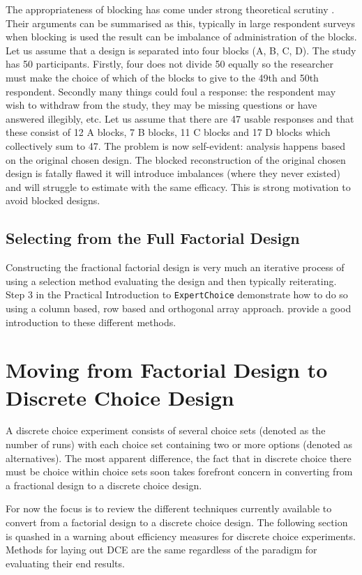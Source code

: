 \documentclass[article, crop=false]{standalone}
\begin{document}
The appropriateness of blocking has come under strong theoretical scrutiny \citep{hensherrosegreene2015, rose2009efficient-stated-choice}.
Their arguments can be summarised as this, typically in large respondent surveys when blocking is used the result can be imbalance of administration of the blocks.
Let us assume that a design is separated into four blocks (A, B, C, D). The study has 50 participants.
Firstly, four does not divide 50 equally so the researcher must make the choice of which of the blocks to give to the 49th and 50th respondent. Secondly many things could foul a response: the respondent may wish to withdraw from the study, they may be missing questions or have answered illegibly, etc.
Let us assume that there are 47 usable responses and that these consist of 12 A blocks, 7 B blocks, 11 C blocks and 17 D blocks which collectively sum to 47.
The problem is now self-evident: analysis happens based on the original chosen design.
The blocked reconstruction of the original chosen design is fatally flawed it will introduce imbalances (where they never existed) and will struggle to estimate with the same efficacy.
This is strong motivation to avoid blocked designs.


\subsection{Selecting from the Full Factorial Design}
Constructing the fractional factorial design is very much an iterative process of using a selection method evaluating the design and then typically reiterating.
Step 3 in the Practical Introduction to \texttt{ExpertChoice} demonstrate how to do so using a column based, row based and orthogonal array approach.
\citet{hensherrosegreene2015} provide a good introduction to these different methods.

\section{Moving from Factorial Design to Discrete Choice Design}
A discrete choice experiment consists of several choice sets (denoted as the number of runs) with each choice set containing two or more options (denoted as alternatives).
The most apparent difference, the fact that in discrete choice there must be choice within choice sets soon takes forefront concern in converting from a fractional design to a discrete choice design.

For now the focus is to review the different techniques currently available to convert from a factorial design to a discrete choice design.
The following section is quashed in a warning about efficiency measures for discrete choice experiments.
Methods for laying out DCE are the same regardless of the paradigm for evaluating their end results.
\end{document}

